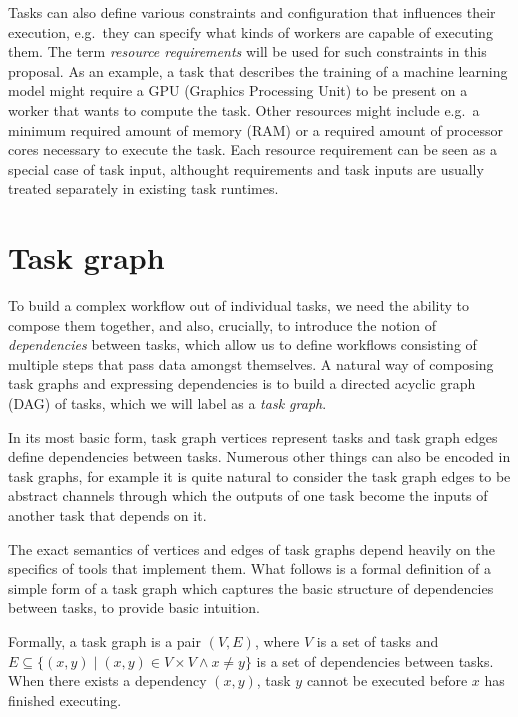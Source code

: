 Tasks can also define various constraints and configuration that influences their execution, e.g.\
they can specify what kinds of workers are capable of executing them. The term
\emph{resource requirements} will be used for such constraints in this proposal. As an example, a task
that describes the training of a machine learning model might require a GPU (Graphics Processing
Unit) to be present on a worker that wants to compute the task. Other resources might include e.g.\
a minimum required amount of memory (RAM) or a required amount of processor cores necessary to
execute the task. Each resource requirement can be seen as a special case of task input, althought
requirements and task inputs are usually treated separately in existing task runtimes.

\section{Task graph}
To build a complex workflow out of individual tasks, we need the ability to compose them together,
and also, crucially, to introduce the notion of \emph{dependencies} between tasks, which allow
us to define workflows consisting of multiple steps that pass data amongst themselves. A natural
way of composing task graphs and expressing dependencies is to build a directed acyclic graph (DAG)
of tasks, which we will label as a \emph{task graph}.

In its most basic form, task graph vertices represent tasks and task graph edges define
dependencies between tasks. Numerous other things can also be encoded in task graphs, for example
it is quite natural to consider the task graph edges to be abstract channels through which the
outputs of one task become the inputs of another task that depends on it.

The exact semantics of vertices and edges of task graphs depend heavily on the specifics of tools
that implement them. What follows is a formal definition of a simple form of a task graph which
captures the basic structure of dependencies between tasks, to provide basic intuition.

Formally, a task graph is a pair $(V, E)$, where $V$ is a set of
tasks and $E \subseteq \{(x, y) \mid (x, y) \in V\times{}V \land x \neq y \}$ is a set of dependencies between tasks. When there exists a
dependency $(x, y)$, task $y$ cannot be executed before
$x$ has finished executing.




